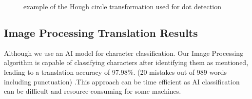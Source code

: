 \begin{figure}[H]
    \centering  
    \hfill
  
    \caption{example of the Hough circle transformation used for dot detection }
    \label{fig:num2}
\end{figure}


\subsection{Image Processing Translation Results}
Although we use an AI model for character classification. Our Image Processing algorithm is capable of classifying characters after identifying them as mentioned, leading to a translation accuracy of 97.98\%.  (20 mistakes out of 989 words including punctuation) .This approach can be time efficient as AI classification can be difficult and resource-consuming for some machines.


